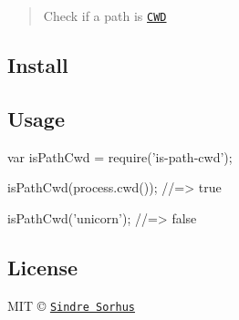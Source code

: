\begin{quote}
Check if a path is \href{http://en.wikipedia.org/wiki/Working_directory}{\tt C\+WD} \end{quote}


\subsection*{Install}




\subsection*{Usage}


\begin{DoxyCode}
var isPathCwd = require('is-path-cwd');

isPathCwd(process.cwd());
//=> true

isPathCwd('unicorn');
//=> false
\end{DoxyCode}


\subsection*{License}

M\+IT © \href{http://sindresorhus.com}{\tt Sindre Sorhus} 
